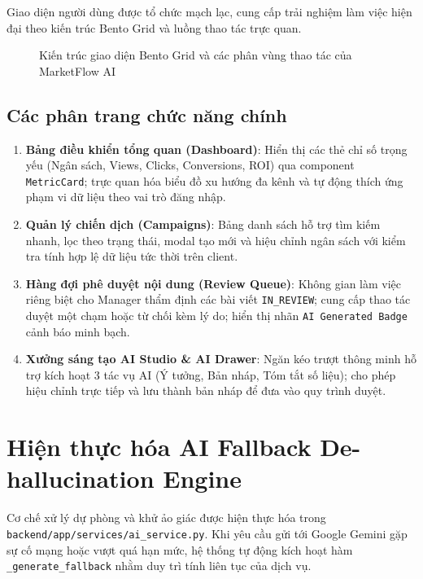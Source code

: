 Giao diện người dùng được tổ chức mạch lạc, cung cấp trải nghiệm làm việc hiện đại theo kiến trúc Bento Grid và luồng thao tác trực quan.

\begin{figure}[H]
\centering

\caption{Kiến trúc giao diện Bento Grid và các phân vùng thao tác của MarketFlow AI}
\label{fig:v9-ui-wireframe}
\end{figure}

\subsection{Các phân trang chức năng chính}
\begin{enumerate}
  \item \textbf{Bảng điều khiển tổng quan (Dashboard)}: Hiển thị các thẻ chỉ số trọng yếu (Ngân sách, Views, Clicks, Conversions, ROI) qua component \texttt{MetricCard}; trực quan hóa biểu đồ xu hướng đa kênh và tự động thích ứng phạm vi dữ liệu theo vai trò đăng nhập.
  \item \textbf{Quản lý chiến dịch (Campaigns)}: Bảng danh sách hỗ trợ tìm kiếm nhanh, lọc theo trạng thái, modal tạo mới và hiệu chỉnh ngân sách với kiểm tra tính hợp lệ dữ liệu tức thời trên client.
  \item \textbf{Hàng đợi phê duyệt nội dung (Review Queue)}: Không gian làm việc riêng biệt cho Manager thẩm định các bài viết \texttt{IN\_REVIEW}; cung cấp thao tác duyệt một chạm hoặc từ chối kèm lý do; hiển thị nhãn \texttt{AI Generated Badge} cảnh báo minh bạch.
  \item \textbf{Xưởng sáng tạo AI Studio \& AI Drawer}: Ngăn kéo trượt thông minh hỗ trợ kích hoạt 3 tác vụ AI (Ý tưởng, Bản nháp, Tóm tắt số liệu); cho phép hiệu chỉnh trực tiếp và lưu thành bản nháp để đưa vào quy trình duyệt.
\end{enumerate}

\section{Hiện thực hóa AI Fallback De-hallucination Engine}

Cơ chế xử lý dự phòng và khử ảo giác được hiện thực hóa trong \texttt{backend/\allowbreak app/\allowbreak services/\allowbreak ai\_service.py}. Khi yêu cầu gửi tới Google Gemini gặp sự cố mạng hoặc vượt quá hạn mức, hệ thống tự động kích hoạt hàm \texttt{\_generate\_fallback} nhằm duy trì tính liên tục của dịch vụ.

